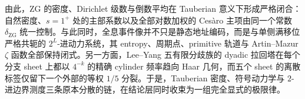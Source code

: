 \noindent
由此，\(\mathrm{ZG}\) 的密度、Dirichlet 级数与倒数平均在 Tauberian 意义下形成严格闭合：自然密度、\(s=1^+\) 处的主部系数以及全部对数加权的 Ces\`aro 主项由同一个常数 \(\delta_{\mathrm{ZG}}\) 统一控制。与此同时，全息事件像并不只是静态地址编码，而是与单侧满移位严格共轭的 \(2^L\)-进动力系统，其 entropy、周期点、primitive 轨道与 Artin--Mazur \(\zeta\) 函数全部保持闭式。另一方面，Lee--Yang 五有限分歧族的 dyadic 拉回塔在每个分支 sheet 上都以 \(4^{-k}\) 的精确 cylinder 频率趋向 Haar 几何，而五个 sheet 的离散标签仅留下一个外部的等权 \(1/5\) 分裂。于是，Tauberian 密度、符号动力学与 \(2\)-进边界测度三条原本分散的链，在结论层同时收束为一组完全显式的极限律。

\endinput
